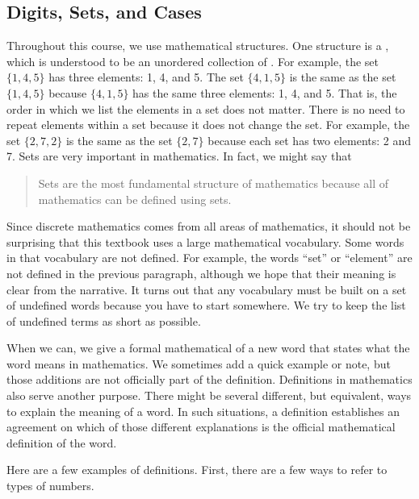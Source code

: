 
\newcommand{\subsetsdigits}{Digits, Sets, and Cases}
\subsection{\subsetsdigits}
\label{sub_sets_digits}

Throughout this course, we use mathematical structures.  One structure is a , which is understood to be an unordered collection of . For example, the set $\{1,4,5\}$ has three elements: 1, 4, and 5.  The set $\{4,1,5\}$ is the same as the set $\{1,4,5\}$ because $\{4,1,5\}$ has the same three elements: 1, 4, and 5. That is, the order in which we list the elements in a set does not matter. 
There is no need to repeat elements within a set because it does not change the set.  For example, the set $\{2,7,2\}$ is the same as the set $\{2,7\}$ because each set has two elements: 2 and 7. 
Sets are very important in mathematics. In fact, we might say that 
\begin{quote}
Sets are the most fundamental structure of mathematics because all of mathematics can be defined using sets.  
\end{quote}

Since discrete mathematics comes from all areas of mathematics, it should not be surprising that this textbook uses a large mathematical vocabulary.  Some words in that vocabulary are not defined.  For example, the words ``set'' or ``element'' are not defined in the previous paragraph, although we hope that their meaning is clear from the narrative.  It turns out that any vocabulary must be built on a set of undefined words because you have to start somewhere.  We try to keep the list of undefined terms as short as possible.

When we can, we give a formal mathematical  of a new word that states what the word means in mathematics. We sometimes add a quick example or note, but those additions are not officially part of the definition.  Definitions in mathematics also serve another purpose.  There might be several different, but equivalent, ways to explain the meaning of a word. In such situations, a definition establishes an agreement on which of those different explanations is the official mathematical definition of the word. 

Here are a few examples of definitions. First, there are a few ways to refer to types of numbers.

